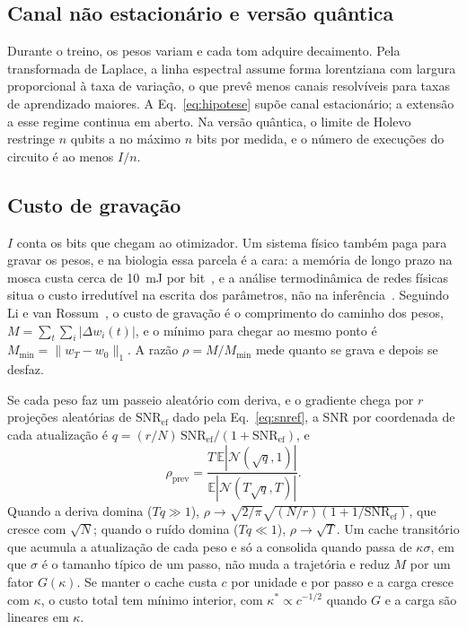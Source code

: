 \documentclass[journal]{IEEEtran}
\newcommand{\SNR}{\mathrm{SNR}}
\begin{document}
\subsection{Canal não estacionário e versão quântica}

Durante o treino, os pesos variam e cada tom adquire decaimento. Pela transformada de Laplace, a linha espectral assume forma lorentziana com largura proporcional à taxa de variação, o que prevê menos canais resolvíveis para taxas de aprendizado maiores. A Eq.~\eqref{eq:hipotese} supõe canal estacionário; a extensão a esse regime continua em aberto. Na versão quântica, o limite de Holevo~\cite{holevo1973} restringe $n$ qubits a no máximo $n$ bits por medida, e o número de execuções do circuito é ao menos $I/n$.

\subsection{Custo de gravação}
\label{sec:gravacao}

$I$ conta os bits que chegam ao otimizador. Um sistema físico também paga para gravar os pesos, e na biologia essa parcela é a cara: a memória de longo prazo na mosca custa cerca de 10~mJ por bit~\cite{girard2023}, e a análise termodinâmica de redes físicas situa o custo irredutível na escrita dos parâmetros, não na inferência~\cite{tkachenko2025}. Seguindo Li e van Rossum~\cite{li2020}, o custo de gravação é o comprimento do caminho dos pesos, $M = \sum_t\sum_i|\Delta w_i(t)|$, e o mínimo para chegar ao mesmo ponto é $M_{\min} = \lVert w_T - w_0\rVert_1$. A razão $\rho = M/M_{\min}$ mede quanto se grava e depois se desfaz.

Se cada peso faz um passeio aleatório com deriva, e o gradiente chega por $r$ projeções aleatórias de $\SNR_{\text{ef}}$ dado pela Eq.~\eqref{eq:snref}, a SNR por coordenada de cada atualização é $q = (r/N)\,\SNR_{\text{ef}}/(1+\SNR_{\text{ef}})$, e
\begin{equation}
\label{eq:rhoprev}
\rho_{\text{prev}} = \frac{T\,\mathbb{E}|\mathcal N(\sqrt q,1)|}{\mathbb{E}|\mathcal N(T\sqrt q,T)|}.
\end{equation}
Quando a deriva domina ($Tq \gg 1$), $\rho \to \sqrt{2/\pi}\sqrt{(N/r)(1+1/\SNR_{\text{ef}})}$, que cresce com $\sqrt N$; quando o ruído domina ($Tq \ll 1$), $\rho \to \sqrt T$. Um cache transitório que acumula a atualização de cada peso e só a consolida quando passa de $\kappa\sigma$, em que $\sigma$ é o tamanho típico de um passo, não muda a trajetória e reduz $M$ por um fator $G(\kappa)$. Se manter o cache custa $c$ por unidade e por passo e a carga cresce com $\kappa$, o custo total tem mínimo interior, com $\kappa^* \propto c^{-1/2}$ quando $G$ e a carga são lineares em $\kappa$.
\end{document}
